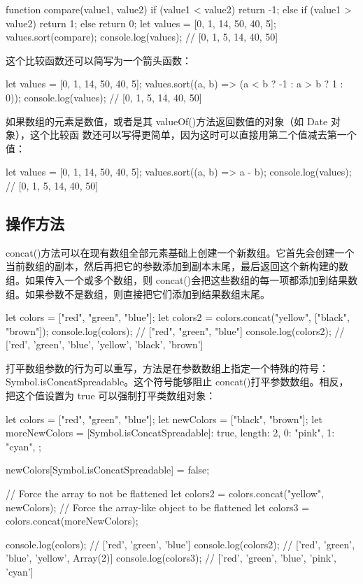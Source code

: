 \begin{js}
function compare(value1, value2) {
    if (value1 < value2) {
        return -1;
    } else if (value1 > value2) {
        return 1;
    } else {
        return 0;
    }
}
let values = [0, 1, 14, 50, 40, 5];
values.sort(compare);
console.log(values); // [0, 1, 5, 14, 40, 50]
\end{js}

这个比较函数还可以简写为一个箭头函数：
\begin{js}
let values = [0, 1, 14, 50, 40, 5];
values.sort((a, b) => (a < b ? -1 : a > b ? 1 : 0));
console.log(values); // [0, 1, 5, 14, 40, 50]
\end{js}

如果数组的元素是数值，或者是其 valueOf()方法返回数值的对象（如 Date 对象），这个比较函
数还可以写得更简单，因为这时可以直接用第二个值减去第一个值：

\begin{js}
let values = [0, 1, 14, 50, 40, 5];
values.sort((a, b) => a - b);
console.log(values); // [0, 1, 5, 14, 40, 50]
\end{js}
\subsection{操作方法}
concat()方法可以在现有数组全部元素基础上创建一个新数组。它首先会创建一个当前数组的副本，然后再把它的参数添加到副本末尾，最后返回这个新构建的数组。如果传入一个或多个数组，则 concat()会把这些数组的每一项都添加到结果数组。如果参数不是数组，则直接把它们添加到结果数组末尾。
\begin{js}
let colors = ["red", "green", "blue"];
let colors2 = colors.concat("yellow", ["black", "brown"]);
console.log(colors); // ["red", "green", "blue"]
console.log(colors2); // ['red', 'green', 'blue', 'yellow', 'black', 'brown']
\end{js}

打平数组参数的行为可以重写，方法是在参数数组上指定一个特殊的符号：Symbol.isConcatSpreadable。这个符号能够阻止 concat()打平参数数组。相反，把这个值设置为 true 可以强制打平类数组对象：
\begin{js}
let colors = ["red", "green", "blue"];
let newColors = ["black", "brown"];
let moreNewColors = {
[Symbol.isConcatSpreadable]: true,
length: 2,
0: "pink",
1: "cyan",
};

newColors[Symbol.isConcatSpreadable] = false;

// Force the array to not be flattened
let colors2 = colors.concat("yellow", newColors);
// Force the array-like object to be flattened
let colors3 = colors.concat(moreNewColors);

console.log(colors); // ['red', 'green', 'blue']
console.log(colors2); // ['red', 'green', 'blue', 'yellow', Array(2)]
console.log(colors3); //  ['red', 'green', 'blue', 'pink', 'cyan']
\end{js}

